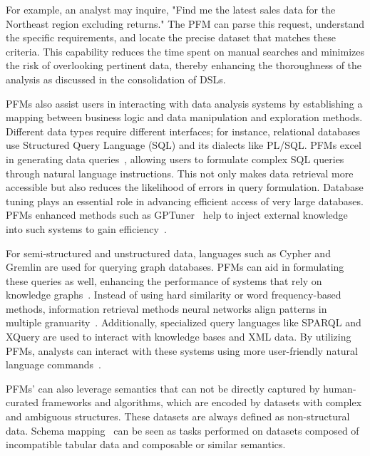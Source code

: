   For example, an analyst may inquire, "Find me the latest sales data for the Northeast region excluding returns." The PFM can parse this request, understand the specific requirements, and locate the precise dataset that matches these criteria. This capability reduces the time spent on manual searches and minimizes the risk of overlooking pertinent data, thereby enhancing the thoroughness of the analysis as discussed in the consolidation of DSLs.
  
  PFMs also assist users in interacting with data analysis systems by establishing a mapping between business logic and data manipulation and exploration methods. Different data types require different interfaces; for instance, relational databases use Structured Query Language (SQL) and its dialects like PL/SQL. PFMs excel in generating data queries~\cite{li2023resdsql, gu2023few, cheng2022binding,smalllargemodelNL2SQL,text2sqlevaluation,readyforNL2SQL,CatSQL}, allowing users to formulate complex SQL queries through natural language instructions. This not only makes data retrieval more accessible but also reduces the likelihood of errors in query formulation. Database tuning plays an essential role in advancing efficient access of very large databases. PFMs enhanced methods such as GPTuner~\cite{GPTuner} help to inject external knowledge into such systems to gain efficiency~\cite{NLPTune}.
  
  For semi-structured and unstructured data, languages such as Cypher and Gremlin are used for querying graph databases. PFMs can aid in formulating these queries as well, enhancing the performance of systems that rely on knowledge graphs~\cite{huang2023kosa}. Instead of using hard similarity or word frequency-based methods, information retrieval methods neural networks align patterns in multiple granuarity~\cite{NeuralDB}. Additionally, specialized query languages like SPARQL and XQuery are used to interact with knowledge bases and XML data. By utilizing PFMs, analysts can interact with these systems using more user-friendly natural language commands~\cite{li2024flexkbqa, Lehmann2023LanguageMA,ReActTable}. 

  PFMs' can also leverage semantics that can not be directly captured by human-curated frameworks and algorithms, which are encoded by datasets with complex and ambiguous structures. These datasets are always defined as non-structural data. Schema mapping~\cite{LLMschema} can be seen as tasks performed on datasets composed of incompatible tabular data and composable or similar semantics.

